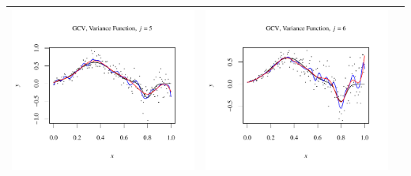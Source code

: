\documentclass[11pt]{article}
\begin{document}
\begin{table}[h!]
\begin{center}
\begin{tabular}{| >{\centering\arraybackslash}m{2.1in} |  >{\centering\arraybackslash}m{2.1in} |  >{\centering\arraybackslash}m{2.1in}|}
      \includegraphics[width=1\linewidth,height=0.18\textheight]{Graphs/2/4/assignment5_a_2_4_5}&
      \includegraphics[width=1\linewidth,height=0.18\textheight]{Graphs/2/4/assignment5_a_2_4_6}\\\hline
    \end{tabular}
  \end{center}
\end{table}
\end{document}
